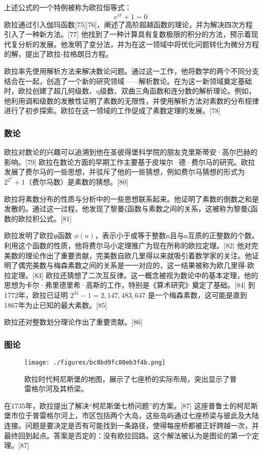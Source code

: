 上述公式的一个特例被称为欧拉恒等式：
\[
e^{i\pi} + 1 = 0~
\]
欧拉通过引入伽玛函数[75][76]，阐述了高阶超越函数的理论，并为解决四次方程引入了一种新方法。[77] 他找到了一种计算具有复数极限的积分的方法，预示着现代复分析的发展。他发明了变分法，并为在这一领域中将优化问题转化为微分方程的解，提出了欧拉-拉格朗日方程。

欧拉率先使用解析方法来解决数论问题。通过这一工作，他将数学的两个不同分支结合在一起，创造了一个新的研究领域——解析数论。在为这一新领域奠定基础时，欧拉创建了超几何级数、q级数、双曲三角函数和连分数的解析理论。例如，他利用调和级数的发散性证明了素数的无限性，并使用解析方法对素数的分布规律进行了初步探索。欧拉在这一领域的工作促成了素数定理的发展。[78]
\subsubsection{数论}  
欧拉对数论的兴趣可以追溯到他在圣彼得堡科学院的朋友克里斯蒂安·高尔巴赫的影响。[79] 欧拉在数论方面的早期工作主要基于皮埃尔·德·费尔马的研究。欧拉发展了费尔马的一些思想，并驳斥了他的一些猜想，例如费尔马猜想的形式为  \(2^{2^{n}} + 1\)（费尔马数）是素数的猜想。[80]  

欧拉将素数分布的性质与分析中的一些思想联系起来。他证明了素数的倒数之和是发散的。通过这一过程，他发现了黎曼ζ函数与素数之间的关系，这被称为黎曼ζ函数的欧拉积公式。[81]  

欧拉发明了欧拉φ函数 \( \phi(n) \)，表示小于或等于整数n且与n互质的正整数的个数。利用这个函数的性质，他将费尔马小定理推广为现在所称的欧拉定理。[82] 他对完美数的理论作出了重要贡献，完美数自欧几里得以来就吸引着数学家的关注。他证明了偶完美数与梅森素数之间的关系是一一对应的，这一结果被称为欧几里得-欧拉定理。[83] 欧拉还猜想了二次互反律。这一概念被视为数论中的基本定理，他的思想为卡尔·弗里德里希·高斯的工作，特别是《算术研究》奠定了基础。[84] 到1772年，欧拉已证明 \( 2^{31} - 1 = 2,147,483,647 \) 是一个梅森素数，这可能是直到1867年为止已知的最大素数。[85]  

欧拉还对整数划分理论作出了重要贡献。[86]
\subsubsection{图论}
\begin{figure}[ht]
\centering
\texttt{[image: ./figures/bc8bd9fc80eb3f4b.png]}
\caption{欧拉时代柯尼斯堡的地图，展示了七座桥的实际布局，突出显示了普雷格尔河及其桥梁。} \label{fig_OL1_4}
\end{figure}
在1735年，欧拉提出了解决“柯尼斯堡七桥问题”的方案。[87] 这座普鲁士的柯尼斯堡市位于普雷格尔河上，市区包括两个大岛，这些岛屿通过七座桥梁与彼此及大陆连接。问题是要决定是否有可能找到一条路径，使得每座桥都被正好跨越一次，并最终回到起点。答案是否定的：没有欧拉回路。这个解法被认为是图论的第一个定理。[87]  


